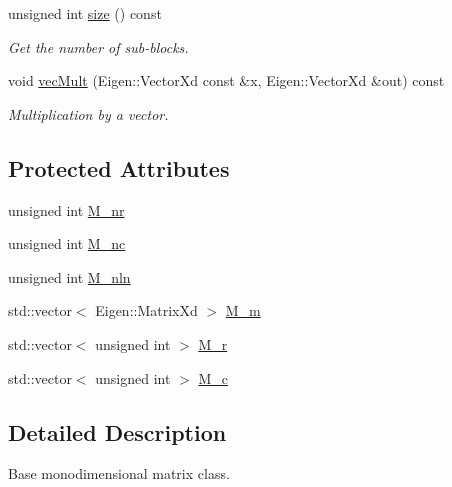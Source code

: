 \begin{DoxyCompactItemize}
unsigned int \hyperlink{classTspeed_1_1BaseMat_ad7ab902ff362d6a356fdde29ae39e9db}{size} () const 
\begin{DoxyCompactList}\small\item\em Get the number of sub-\/blocks. \end{DoxyCompactList}\item 
void \hyperlink{classTspeed_1_1BaseMat_a4b8320ccf7f1cf40ce6e6448c5d035ab}{vec\-Mult} (Eigen\-::\-Vector\-Xd const \&x, Eigen\-::\-Vector\-Xd \&out) const 
\begin{DoxyCompactList}\small\item\em Multiplication by a vector. \end{DoxyCompactList}\end{DoxyCompactItemize}
\subsection*{Protected Attributes}
\begin{DoxyCompactItemize}
\item 
unsigned int \hyperlink{classTspeed_1_1BaseMat_a2122ee11f990f68aadf6046e7c02aa01}{M\-\_\-nr}
\item 
unsigned int \hyperlink{classTspeed_1_1BaseMat_aaeeb3b9b5163d2ad7213877c6d9d3a48}{M\-\_\-nc}
\item 
unsigned int \hyperlink{classTspeed_1_1BaseMat_a6a75298d3c989a182f972916f894df47}{M\-\_\-nln}
\item 
std\-::vector$<$ Eigen\-::\-Matrix\-Xd $>$ \hyperlink{classTspeed_1_1BaseMat_a4020a63099be7634e355b66c21a37bc0}{M\-\_\-m}
\item 
std\-::vector$<$ unsigned int $>$ \hyperlink{classTspeed_1_1BaseMat_a8147ef48c03cd2080c35e35c213c21aa}{M\-\_\-r}
\item 
std\-::vector$<$ unsigned int $>$ \hyperlink{classTspeed_1_1BaseMat_a0c1966f176c1bf095decc0f40fd2397f}{M\-\_\-c}
\end{DoxyCompactItemize}


\subsection{Detailed Description}
Base monodimensional matrix class. 

